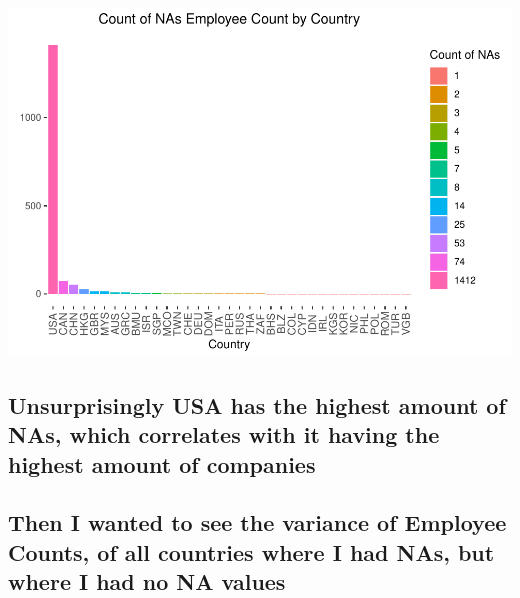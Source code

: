 \documentclass[]{article}
\begin{document}
\includegraphics{Main_files/figure-latex/unnamed-chunk-9-1.pdf}

\hypertarget{unsurprisingly-usa-has-the-highest-amount-of-nas-which-correlates-with-it-having-the-highest-amount-of-companies}{%
\subsection{Unsurprisingly USA has the highest amount of NAs, which
correlates with it having the highest amount of
companies}\label{unsurprisingly-usa-has-the-highest-amount-of-nas-which-correlates-with-it-having-the-highest-amount-of-companies}}

\hypertarget{then-i-wanted-to-see-the-variance-of-employee-counts-of-all-countries-where-i-had-nas-but-where-i-had-no-na-values}{%
\subsection{Then I wanted to see the variance of Employee Counts, of all
countries where I had NAs, but where I had no NA
values}\label{then-i-wanted-to-see-the-variance-of-employee-counts-of-all-countries-where-i-had-nas-but-where-i-had-no-na-values}}
\end{document}
